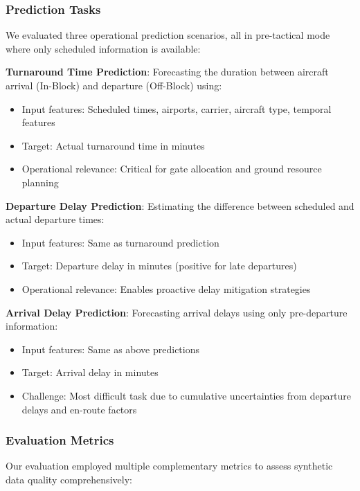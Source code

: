\documentclass[conference]{IEEEtran}
\begin{document}
\subsubsection{Prediction Tasks}

We evaluated three operational prediction scenarios, all in pre-tactical mode where only scheduled information is available:

\textbf{Turnaround Time Prediction}: 
Forecasting the duration between aircraft arrival (In-Block) and departure (Off-Block) using:
\begin{itemize}
    \item Input features: Scheduled times, airports, carrier, aircraft type, temporal features
    \item Target: Actual turnaround time in minutes
    \item Operational relevance: Critical for gate allocation and ground resource planning
\end{itemize}

\textbf{Departure Delay Prediction}:
Estimating the difference between scheduled and actual departure times:
\begin{itemize}
    \item Input features: Same as turnaround prediction
    \item Target: Departure delay in minutes (positive for late departures)
    \item Operational relevance: Enables proactive delay mitigation strategies
\end{itemize}

\textbf{Arrival Delay Prediction}:
Forecasting arrival delays using only pre-departure information:
\begin{itemize}
    \item Input features: Same as above predictions
    \item Target: Arrival delay in minutes
    \item Challenge: Most difficult task due to cumulative uncertainties from departure delays and en-route factors
\end{itemize}

\subsubsection{Evaluation Metrics}

Our evaluation employed multiple complementary metrics to assess synthetic data quality comprehensively:
\end{document}
